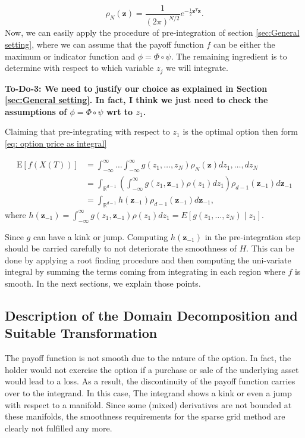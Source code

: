 \documentclass[11pt]{article}
\newcommand{\expt}[1]{\mathrm{E}\left[#1\right]}
\newcommand{\rset}{\mathbb{R}}
\newcommand{\PERIOD}{.}
\newcommand{\COMMA}{,}
\begin{document}
\begin{equation}\label{eq: multivariate gaussian distribution}
\rho_N(\mathbf{z})=\frac{1}{(2 \pi)^{N/2}} e^{-\frac{1}{2} \mathbf{z}^T \mathbf{z}} \PERIOD
\end{equation}
Now, we can easily apply the procedure of pre-integration  of section \ref{sec:General setting}, where we can assume that the payoff function $f$ can be either the  maximum or indicator function and $\phi=\Phi \circ \psi$. The remaining ingredient is to determine with respect to which variable $z_j$ we will integrate.

\textbf{To-Do-3:  We need to justify our choice as explained in Section \ref{sec:General setting}. In fact, I think we just need to check the assumptions of $\phi=\Phi \circ \psi$ wrt to $z_1$.}

Claiming that pre-integrating with respect to $z_1$ is the optimal option then form \eqref{eq: option price as integral}

\begin{align}\label{eq: pre_integration_step_wrt_y1}
\expt{f(X(T))}&=\int_{-\infty}^{\infty} \dots \int_{-\infty}^{\infty} g(z_1,\dots,z_N) \rho_N(\mathbf{z}) dz_1,\dots,dz_N \nonumber\\ 
&=\int_{\rset^{d-1}} \left(\int_{-\infty}^\infty g(z_1,\mathbf{z}_{-1}) \rho(z_1) dz_1  \right) \rho_{d-1}(\mathbf{z}_{-1}) d\mathbf{z}_{-1}\nonumber\\	
&=\int_{\rset^{d-1}} h(\mathbf{z}_{-1}) \rho_{d-1}(\mathbf{z}_{-1}) d\mathbf{z}_{-1}\COMMA	
\end{align}
where $h(\mathbf{z}_{-1})=\int_{-\infty}^\infty g(z_1,\mathbf{z}_{-1}) \rho(z_1) dz_1=  E\left[ g\left(z_1, \ldots, z_N \right)  \mid z_1\right] $.


Since $g$ can have a kink  or jump. Computing $h(\mathbf{z}_{-1})$ in the pre-integration step should be carried carefully to not deteriorate the smoothness of $H$. This can be done by applying a root finding procedure and then computing the uni-variate integral by summing the terms coming from integrating in each region where $f$ is smooth. In the next sections, we explain those points.



\subsection{Description of the Domain Decomposition and Suitable Transformation}
The payoff function is not smooth due to
the nature of the option. In fact, the holder would not exercise
the option if a purchase or sale of the underlying asset would lead to a loss. As a result, the discontinuity of the payoff function carries over to the integrand. In this case, The integrand shows a kink  or even a jump with respect to a  manifold. Since some
(mixed) derivatives are not bounded at these manifolds, the smoothness requirements for the sparse grid method are clearly not fulfilled any more.
\end{document}
